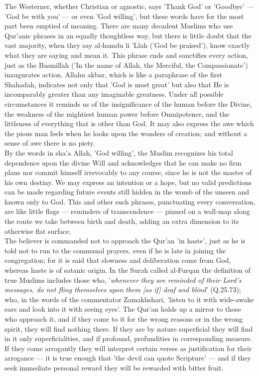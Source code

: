 \documentclass[10pt, twoside,openright]{book}
\begin{document}
The Westerner, whether Christian or agnostic, says 'Thank God' or 'Goodbye' --- 'God be with you' --- or 
even 'God willing', but these words have for the most part been emptied of meaning. There are many 
decadent Muslims who use Qur'anic phrases in an equally thoughtless way, but there is little doubt 
that the vast majority, when they say al\hyp{}hamdu li 'Llah ('God be praised'), know exactly what they 
are saying and mean it. This phrase ends and sanctifies every action, just as the Basmillah ('In the 
name of Allah, the Merciful, the Compassionate') inaugurates action. Allahu akbar, which is like a 
paraphrase of the first Shahadah, indicates not only that 'God is most great' but also that He is 
incomparably greater than any imaginable greatness. Under all possible circumstances it reminds us of 
the insignificance of the human before the Divine, the weakness of the mightiest human power before 
Omnipotence, and the littleness of everything that is other than God. It may also express the awe 
which the pious man feels when he looks upon the wonders of creation; and without a sense of awe 
there is no piety. \\

By the words in sha'a Allah, 'God willing', the Muslim recognizes his total dependence upon the 
divine Will and acknowledges that he can make no firm plans nor commit himself irrevocably to any 
course, since he is not the master of his own destiny. We may express an intention or a hope, but no 
valid predictions can be made regarding future events still hidden in the womb of the unseen and 
known only to God. This and other such phrases, punctuating every conversation, are like little flags 
--- reminders of transcendence --- pinned on a wall-map along the route we take between birth and death, adding an extra dimension to its otherwise flat surface. \\

The believer is commanded not to approach the Qur'an 'in haste', just as he is told not to run to the 
communal prayers, even if he is late in joining the congregation; for it is said that slowness and 
deliberation come from God, whereas haste is of satanic origin. In the Surah called al\hyp{}Furqan the 
definition of true Muslims includes those who, '\emph{whenever they are reminded of their Lord's messages, do not fling themselves upon them [as if] deaf and blind}' (Q.25.73); who, in the words of the 
commentator Zamakhshari, 'listen to it with wide\hyp{}awake ears and look into it with seeing eyes'. The 
Qur'an holds up a mirror to those who approach it, and if they come to it for the wrong reasons or in 
the wrong spirit, they will find nothing there. If they are by nature superficial they will find in 
it only superficialities, and if profound, profundities in corresponding measure. If they come 
arrogantly they will interpret certain verses as justification for their arrogance --- it is true 
enough that 'the devil can quote Scripture' --- and if they seek immediate personal reward they will be 
rewarded with bitter fruit. \\
\end{document}
